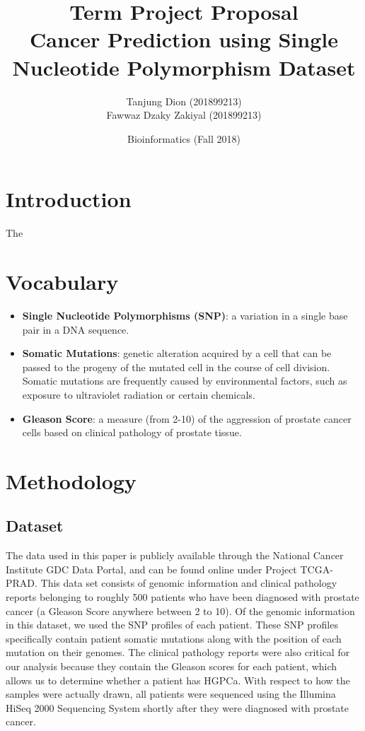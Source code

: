 \documentclass[a4paper,oneside]{article}
\begin{document}
\title{\vspace{-0.7in}Term Project Proposal\\
Cancer Prediction using Single Nucleotide Polymorphism Dataset}
\author{Tanjung Dion (201899213)\\Fawwaz Dzaky Zakiyal (201899213)\\}
\date{Bioinformatics (Fall 2018)}
\maketitle
 
\section{Introduction}
The

\section{Vocabulary}
\begin{itemize}
\item \textbf{Single Nucleotide Polymorphisms (SNP)}: a variation in a single base pair in a DNA sequence.
\item \textbf{Somatic Mutations}: genetic alteration acquired by a cell that can be passed to the progeny of the mutated cell in the course of cell division. Somatic mutations are frequently caused by environmental factors, such as exposure to ultraviolet radiation or certain chemicals.
\item \textbf{Gleason Score}: a measure (from 2-10) of the aggression of prostate cancer cells based on clinical pathology of prostate tissue.
\end{itemize}


\section{Methodology}
\subsection{Dataset}
The data used in this paper is publicly available through the National Cancer Institute GDC Data Portal, and can be found online under Project TCGA-PRAD. This data set consists of genomic information and clinical pathology reports belonging to roughly 500 patients who have been diagnosed with prostate cancer (a Gleason Score anywhere between 2 to 10). Of the genomic information in this dataset, we used the SNP profiles of each patient. These SNP profiles specifically contain patient somatic mutations along with the position of each mutation on their genomes. The clinical pathology reports were also critical for our analysis because they contain the Gleason scores for each patient, which allows us to determine whether a patient has HGPCa. With respect to how the samples were actually drawn, all patients were sequenced using the Illumina HiSeq 2000 Sequencing System shortly after they were diagnosed with prostate cancer.
\end{document}
